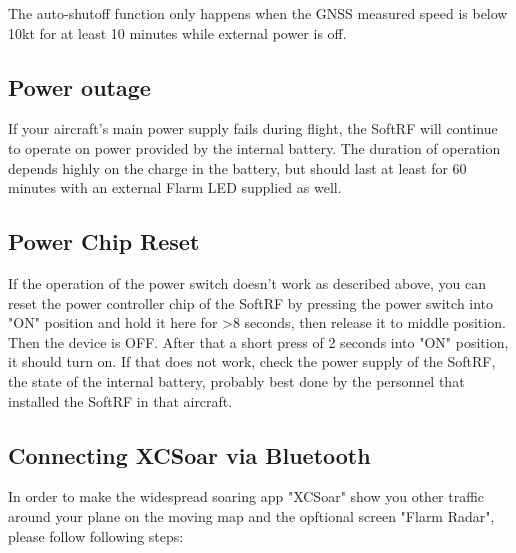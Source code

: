 \documentclass[10pt,a4paper]{article}
\begin{document}
The auto-shutoff function only happens when the GNSS measured speed is below 10kt for at least 10 minutes while external power is off.

\subsection{Power outage}
If your aircraft's main power supply fails during flight, the SoftRF will continue to operate on power provided by the internal battery. The duration of operation depends highly on the charge in the battery, but should last at least for 60 minutes with an external Flarm LED supplied as well.

\begin{center}
\end{center}

\subsection{Power Chip Reset}\label{power_reset}
If the operation of the power switch doesn't work as described above, you can reset the power controller chip of the SoftRF by pressing the power switch into "ON" position and hold it here for >8 seconds, then release it to middle position. Then the device is OFF. After that a short press of 2 seconds into "ON" position, it should turn on. If that does not work, check the power supply of the SoftRF, the state of the internal battery, probably best done by the personnel that installed the SoftRF in that aircraft.

\subsection{Connecting XCSoar via Bluetooth}
In order to make the widespread soaring app "XCSoar" show you other traffic around your plane on the moving map and the opftional screen "Flarm Radar", please follow following steps:
\end{document}
